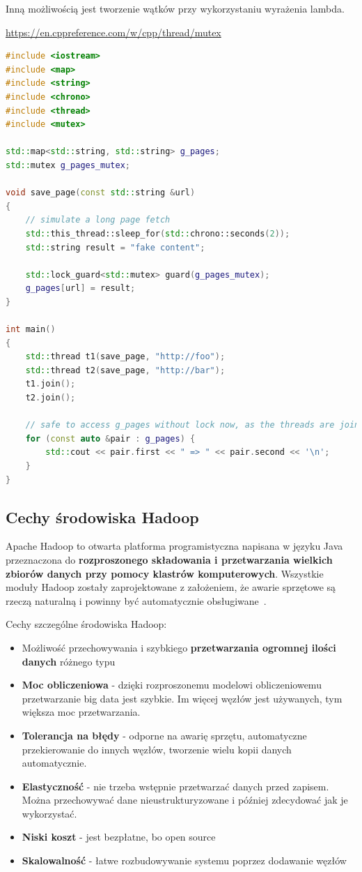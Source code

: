 \documentclass[wi]{zut}
\begin{document}
Inną możliwością jest tworzenie wątków przy wykorzystaniu wyrażenia lambda.

{\url{https://en.cppreference.com/w/cpp/thread/mutex}}{\label{kod:przyklad}}
\begin{lstlisting}[language=C++]
#include <iostream>
#include <map>
#include <string>
#include <chrono>
#include <thread>
#include <mutex>
 
std::map<std::string, std::string> g_pages;
std::mutex g_pages_mutex;
 
void save_page(const std::string &url)
{
    // simulate a long page fetch
    std::this_thread::sleep_for(std::chrono::seconds(2));
    std::string result = "fake content";
 
    std::lock_guard<std::mutex> guard(g_pages_mutex);
    g_pages[url] = result;
}
 
int main() 
{
    std::thread t1(save_page, "http://foo");
    std::thread t2(save_page, "http://bar");
    t1.join();
    t2.join();
 
    // safe to access g_pages without lock now, as the threads are joined
    for (const auto &pair : g_pages) {
        std::cout << pair.first << " => " << pair.second << '\n';
    }
}
\end{lstlisting}

\subsection{Cechy środowiska Hadoop}

Apache Hadoop to otwarta platforma programistyczna napisana w języku Java przeznaczona do \textbf{rozproszonego składowania i przetwarzania wielkich zbiorów danych przy pomocy klastrów komputerowych}. Wszystkie moduły Hadoop zostały zaprojektowane z założeniem, że awarie sprzętowe są rzeczą naturalną i powinny być automatycznie obsługiwane~\cite{Korytkowski_hadoop}.

Cechy szczególne środowiska Hadoop:

\begin{itemize}
    \item Możliwość przechowywania i szybkiego \textbf{przetwarzania ogromnej ilości danych} różnego typu
    \item \textbf{Moc obliczeniowa} - dzięki rozproszonemu modelowi obliczeniowemu przetwarzanie big data jest szybkie. Im więcej węzłów jest używanych, tym większa moc przetwarzania.
    \item \textbf{Tolerancja na błędy} - odporne na awarię sprzętu, automatyczne przekierowanie do innych węzłów, tworzenie wielu kopii danych automatycznie.
    \item \textbf{Elastyczność} - nie trzeba wstępnie przetwarzać danych przed zapisem. Można przechowywać dane nieustrukturyzowane i później zdecydować jak je wykorzystać.
    \item \textbf{Niski koszt} - jest bezpłatne, bo open source
    \item \textbf{Skalowalność} - łatwe rozbudowywanie systemu poprzez dodawanie węzłów
\end{itemize}
\end{document}

